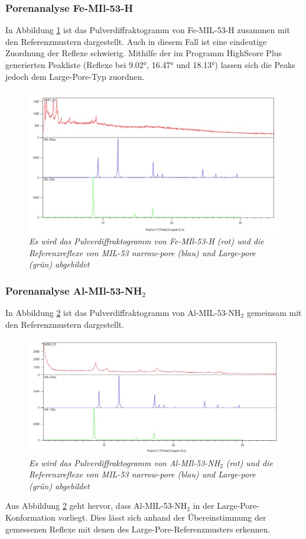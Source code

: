 \documentclass[12pt, a4paper]{article}
\begin{document}
\subsubsection{Porenanalyse Fe-MIl-53-H}
In Abbildung \ref{MOF120ver} ist das Pulverdiffraktogramm von Fe-MIL-53-H zusammen mit den Referenzmustern dargestellt. Auch in diesem Fall ist eine eindeutige Zuordnung der Reflexe schwierig. 
Mithilfe der im Programm HighScore Plus generierten Peakliste (Reflexe bei 9.02°, 16.47° und 18.13°) lassen sich die Peaks jedoch dem Large-Pore-Typ zuordnen.
\newpage
\begin{figure}[!ht]
    \includegraphics[scale=0.5]{MOF120ver.png}
    \caption{\textit{Es wird das Pulverdiffraktogramm von Fe-MIl-53-H (rot) und die Referenzreflexe von MIL-53 narrow-pore (blau) und Large-pore (grün) abgebildet}}
    \label{MOF120ver}
\end{figure}

\subsubsection{\texorpdfstring{Porenanalyse Al-MIl-53-NH$_2$}{Porenanalyse Al-MIl-53-NH2}}

In Abbildung \ref{MOF225ver} ist das Pulverdiffraktogramm von Al-MIL-53-NH$_2$ gemeinsam mit den Referenzmustern dargestellt. 
\begin{figure}[!h]
    \centering
    \includegraphics[scale=0.5]{MOF225ver.png}
    \caption{\textit{Es wird das Pulverdiffraktogramm von Al-MIl-53-NH$_2$ (rot) und die Referenzreflexe von MIL-53 narrow-pore (blau) und Large-pore (grün) abgebildet}}
    \label{MOF225ver}
\end{figure}
Aus Abbildung \ref{MOF225ver} geht hervor, dass Al-MIL-53-NH$_2$ in der Large-Pore-Konformation vorliegt. Dies lässt sich anhand der Übereinstimmung der gemessenen Reflexe mit denen des Large-Pore-Referenzmusters erkennen.
\end{document}
